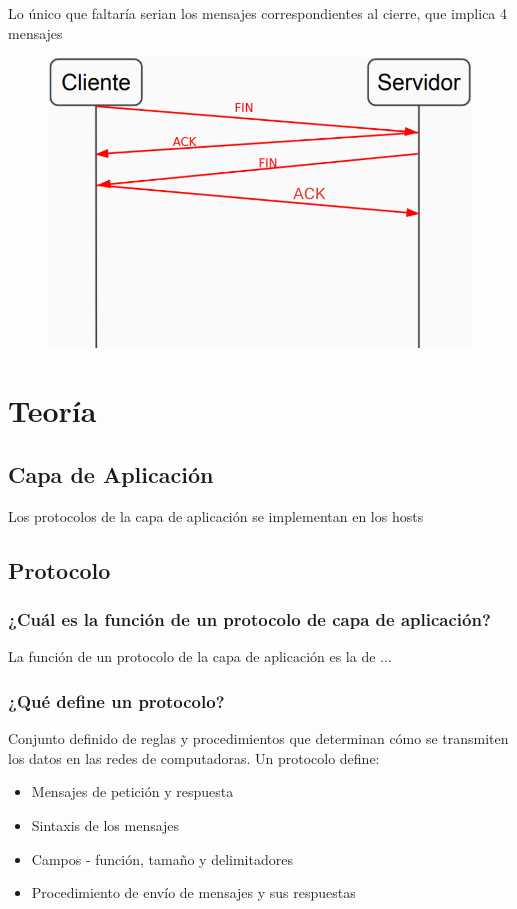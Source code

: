 \documentclass[titlepage,a4paper]{article}
\begin{document}
Lo único que faltaría serian los mensajes correspondientes al cierre, que implica 4 mensajes

\begin{figure}[H]
\centering
\includegraphics[width=\textwidth]{resolucion6.png}
\end{figure}


\section{Teoría}\label{sec:teoria}

\subsection{Capa de Aplicación}\label{sec:capaaplicacion}

Los protocolos de la capa de aplicación se implementan en los hosts


\subsection{Protocolo\label{sec:protocolo}}


\subsubsection{ ¿Cuál es la función de un protocolo de capa de aplicación?}

La función de un protocolo de la capa de aplicación es la de ...

\subsubsection{¿Qué define un protocolo?} 
Conjunto definido de reglas y procedimientos que determinan cómo se transmiten los datos en las redes de computadoras. Un protocolo define:

\begin{itemize}
    \item Mensajes de petición y respuesta
    \item Sintaxis de los mensajes
    \item Campos - función, tamaño y delimitadores
    \item Procedimiento de envío de mensajes y sus respuestas
\end{itemize}
\end{document}
